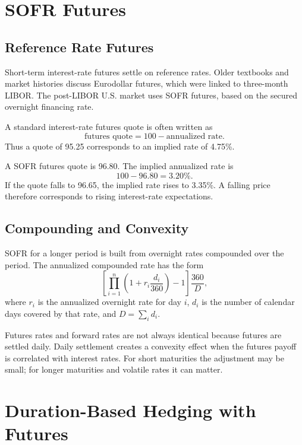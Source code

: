\section{SOFR Futures}

\subsection{Reference Rate Futures}

Short-term interest-rate futures settle on reference rates. Older textbooks and
market histories discuss Eurodollar futures, which were linked to three-month
LIBOR. The post-LIBOR U.S. market uses SOFR futures, based on the secured
overnight financing rate.

A standard interest-rate futures quote is often written as
\[
    \text{futures quote}=100-\text{annualized rate}.
\]
Thus a quote of 95.25 corresponds to an implied rate of 4.75\%.

\begin{exmp}
A SOFR futures quote is 96.80. The implied annualized rate is
\[
    100-96.80=3.20\%.
\]
If the quote falls to 96.65, the implied rate rises to 3.35\%. A falling price
therefore corresponds to rising interest-rate expectations.
\end{exmp}

\subsection{Compounding and Convexity}

SOFR for a longer period is built from overnight rates compounded over the
period. The annualized compounded rate has the form
\[
    \left[\prod_{i=1}^n \left(1+r_i\frac{d_i}{360}\right)-1\right]
    \frac{360}{D},
\]
where $r_i$ is the annualized overnight rate for day $i$, $d_i$ is the number
of calendar days covered by that rate, and $D=\sum_i d_i$.

Futures rates and forward rates are not always identical because futures are
settled daily. Daily settlement creates a convexity effect when the futures
payoff is correlated with interest rates. For short maturities the adjustment
may be small; for longer maturities and volatile rates it can matter.

\section{Duration-Based Hedging with Futures}

